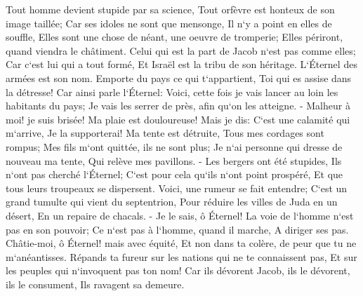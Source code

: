 \verse Tout homme devient stupide par sa science, Tout orfèvre est honteux de son image taillée; Car ses idoles ne sont que mensonge, Il n`y a point en elles de souffle, 
\verse Elles sont une chose de néant, une oeuvre de tromperie; Elles périront, quand viendra le châtiment. 
\verse Celui qui est la part de Jacob n`est pas comme elles; Car c`est lui qui a tout formé, Et Israël est la tribu de son héritage. L`Éternel des armées est son nom. 
\verse Emporte du pays ce qui t`appartient, Toi qui es assise dans la détresse! 
\verse Car ainsi parle l`Éternel: Voici, cette fois je vais lancer au loin les habitants du pays; Je vais les serrer de près, afin qu`on les atteigne. - 
\verse Malheur à moi! je suis brisée! Ma plaie est douloureuse! Mais je dis: C`est une calamité qui m`arrive, Je la supporterai! 
\verse Ma tente est détruite, Tous mes cordages sont rompus; Mes fils m`ont quittée, ils ne sont plus; Je n`ai personne qui dresse de nouveau ma tente, Qui relève mes pavillons. - 
\verse Les bergers ont été stupides, Ils n`ont pas cherché l`Éternel; C`est pour cela qu`ils n`ont point prospéré, Et que tous leurs troupeaux se dispersent. 
\verse Voici, une rumeur se fait entendre; C`est un grand tumulte qui vient du septentrion, Pour réduire les villes de Juda en un désert, En un repaire de chacals. - 
\verse Je le sais, ô Éternel! La voie de l`homme n`est pas en son pouvoir; Ce n`est pas à l`homme, quand il marche, A diriger ses pas. 
\verse Châtie-moi, ô Éternel! mais avec équité, Et non dans ta colère, de peur que tu ne m`anéantisses. 
\verse Répands ta fureur sur les nations qui ne te connaissent pas, Et sur les peuples qui n`invoquent pas ton nom! Car ils dévorent Jacob, ils le dévorent, ils le consument, Ils ravagent sa demeure. 

